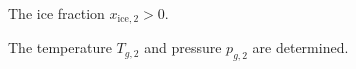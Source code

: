 The ice fraction \( x_{\text{ice},2} > 0 \).  

The temperature \( T_{g,2} \) and pressure \( p_{g,2} \) are determined.